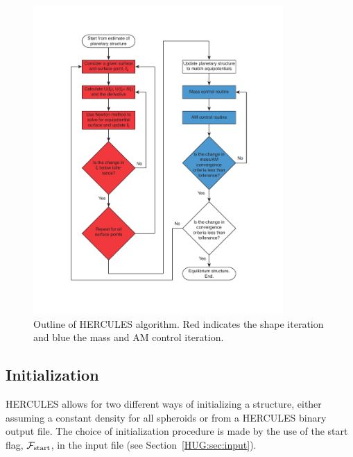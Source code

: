 \documentclass[11pt, oneside]{article}   	%
\begin{document}
\clearpage
\begin{figure}[]
   \centering
   \includegraphics[width=0.85\textwidth, trim={3cm 2.5cm 3cm 2.5cm },clip]{Figures/HERCULES_algorythm2.pdf} 
   \caption{Outline of HERCULES algorithm. Red indicates the shape iteration and blue the mass and AM control iteration.}
   \label{HUG:fig:algorythm}
\end{figure}


\subsection{Initialization}
\label{HUG:sec:init}

HERCULES allows for two different ways of initializing a structure, either assuming a constant density for all spheroids or from a HERCULES binary output file.
The choice of initialization procedure is made by the use of the start flag, $\mathcal{F}_{\rm start}$, in the input file (see Section~\ref{HUG:sec:input}).
 
\end{document}
